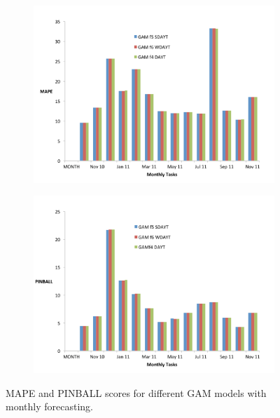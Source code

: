 \documentclass[conference]{IEEEtran}
\begin{document}
\begin{figure}[!ht]
\centering
\begin{subfigure}[b]{\linewidth}
\includegraphics[width=\linewidth]{gfx/results/load/DAYT-MAPE.pdf}
\label{subfig:acf-temp-1year}
\end{subfigure}
\begin{subfigure}[b]{\linewidth}
\includegraphics[width=\linewidth]{gfx/results/load/DAYT-PINBALL.pdf}
\label{subfig:acf-load-1year}
\end{subfigure}
\caption{MAPE and PINBALL scores for different GAM models with monthly forecasting.}
\label{fig:load-DAYT}
\end{figure}
\end{document}
